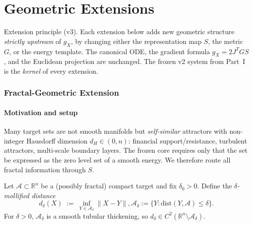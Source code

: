 \documentclass[11pt,oneside]{amsart}
\def\qquad{ }%
\def\textbf#1{#1}%
\theoremstyle{plain}
\theoremstyle{definition}
\newcommand{\gX}{g_X}
\newcommand{\R}{\mathbb{R}}
\begin{document}

\part{Geometric Extensions}

\begin{lockbox}
\textbf{Extension principle (v3).} Each extension below adds new
geometric structure \emph{strictly upstream} of $\gX$, by changing
either the representation map $S$, the metric $G$, or the energy
template. \textbf{The canonical ODE, the gradient formula
$\gX = 2J^{T}GS$, and the Euclidean projection are unchanged.}
The frozen v2 system from Part~I is the \emph{kernel} of every
extension.
\end{lockbox}

\section{Fractal-Geometric Extension}
\label{sec:fractal}

\subsection{Motivation and setup}

Many target sets are not smooth manifolds but \emph{self-similar}
attractors with non-integer Hausdorff dimension $d_{H}\in(0,n)$:
financial support/resistance, turbulent attractors, multi-scale
boundary layers. The frozen core requires only that the set be
expressed as the zero level set of a smooth energy. We therefore
route all fractal information through $S$.

Let $\mathcal{A}\subset\R^{n}$ be a (possibly fractal) compact target
and fix $\delta_{0}>0$. Define the \emph{$\delta$-mollified distance}
\[
  d_{\delta}(X) \;:=\; \inf_{Y\in\mathcal{A}_{\delta}}\|X-Y\|,
  \qquad \mathcal{A}_{\delta} := \{Y : \mathrm{dist}(Y,\mathcal{A})\le\delta\}.
\]
For $\delta>0$, $\mathcal{A}_{\delta}$ is a smooth tubular thickening,
so $d_{\delta}\in C^{2}(\R^{n}\setminus\mathcal{A}_{\delta})$.
\end{document}
